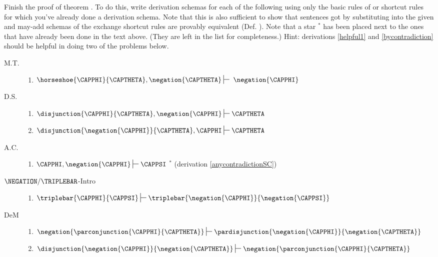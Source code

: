 Finish the proof of theorem . 
To do this, write derivation schemas for each of the following using only the basic rules of \GSD{} or shortcut rules for which you've already done a derivation schema. 
Note that this is also sufficient to show that sentences got by substituting into the given and may-add schemas of the \GSD{} exchange shortcut rules are provably equivalent (Def. ).
Note that a star $^*$ has been placed next to the ones that have already been done in the text above. 
(They are left in the list for completeness.) 
Hint: derivations \ref{helpful1} and \ref{bycontradiction} should be helpful in doing two of the problems below.
\begin{multicols}{2}
\begin{description}
\item[M.T.]\hfill{}
\begin{enumerate}
\item $\horseshoe{\CAPPHI}{\CAPTHETA},\negation{\CAPTHETA}\sststile{}{}\;\negation{\CAPPHI}$
\end{enumerate}
\item[D.S.]\hfill{}
\begin{enumerate}[start=2]
\item $\disjunction{\CAPPHI}{\CAPTHETA}, \negation{\CAPPHI}\sststile{}{}\CAPTHETA$
\item $\disjunction{\negation{\CAPPHI}}{\CAPTHETA},\CAPPHI\sststile{}{}\CAPTHETA$
\end{enumerate}
\item[A.C.]\hfill{}
\begin{enumerate}[start=4]
\item $\CAPPHI,\negation{\CAPPHI}\sststile{}{}\CAPPSI$ $^*$ (derivation \ref{anycontradictionSC})
\end{enumerate}
\item[$\NEGATION/\TRIPLEBAR$-Intro]\hfill{}
\begin{enumerate}[start=5]
\item $\triplebar{\CAPPHI}{\CAPPSI}\sststile{}{}\triplebar{\negation{\CAPPHI}}{\negation{\CAPPSI}}$
\end{enumerate}
\item[DeM]\hfill{}
\begin{enumerate}[start=6]
\item ${\negation{\parconjunction{\CAPPHI}{\CAPTHETA}}}\sststile{}{}{\pardisjunction{\negation{\CAPPHI}}{\negation{\CAPTHETA}}}$
\item ${\disjunction{\negation{\CAPPHI}}{\negation{\CAPTHETA}}}\sststile{}{}{\negation{\parconjunction{\CAPPHI}{\CAPTHETA}}}$

\end{enumerate}
\end{description}
\end{multicols}
